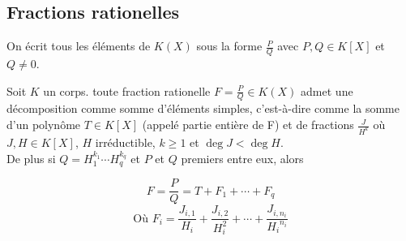 \subsection{Fractions rationelles}

\begin{definition}
	On écrit tous les éléments de $K(X)$ sous la forme $\frac{P}{Q}$ avec $P,Q \in K[X]$ et $Q \neq 0$.
\end{definition}

\begin{theorem}
	Soit $K$ un corps. toute fraction rationelle $F = \frac{P}{Q} \in K(X)$ admet une décomposition comme somme
	d'éléments simples, c'est-à-dire comme la somme d'un polynôme $T \in K[X]$ (appelé partie entière de F) et de fractions
	$\frac{J}{H^k}$ où $J,H \in K[X]$, $H$ irréductible, $k \geq 1$ et $\deg J < \deg H$. \\

	De plus si $Q = H_1^{k_1} \cdots H_q^{k_q}$ et $P$ et $Q$ premiers entre eux, alors

	$$ F = \frac{P}{Q} = T + F_1 + \cdots + F_q$$
	$$\text{Où } F_i = \frac{J_{i,1}}{H_i} + \frac{J_{i,2}}{H_i^2} + \cdots + \frac{J_{i,n_i}}{{H_i}^{n_i}}$$
\end{theorem}
